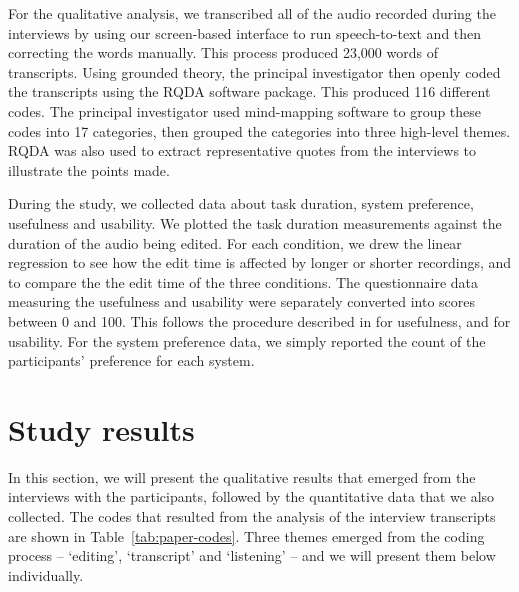 For the qualitative analysis, we transcribed all of the audio recorded during the interviews by using our screen-based
interface to run speech-to-text and then correcting the words manually. This process produced 23,000 words of
transcripts. Using grounded theory, the principal investigator then openly coded the transcripts using the RQDA
software package. This produced 116 different codes. The principal investigator used mind-mapping software to group
these codes into 17 categories, then grouped the categories into three high-level themes. RQDA was also used to extract
representative quotes from the interviews to illustrate the points made.

During the study, we collected data about task duration, system preference, usefulness and usability.
We plotted the task duration measurements against the duration of the audio being edited. For each condition, we drew
the linear regression to see how the edit time is affected by longer or shorter recordings, and to compare the the edit
time of the three conditions.
The questionnaire data measuring the usefulness and usability were separately converted into scores between 0 and 100.
This follows the procedure described in \citet{Davis1989} for usefulness, and \citet{Brooke1996} for usability.
For the system preference data, we simply reported the count of the participants' preference for each system.

\section{Study results}\label{sec:paper-results}

In this section, we will present the qualitative results that emerged from the interviews with the participants,
followed by the quantitative data that we also collected.  The codes that resulted from the analysis of the interview
transcripts are shown in Table~\ref{tab:paper-codes}. Three themes emerged from the coding process -- `editing',
`transcript' and `listening' -- and we will present them below individually. 


